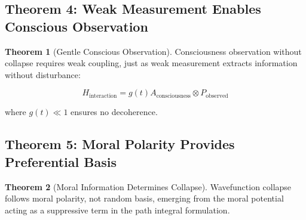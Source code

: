 \documentclass[12pt,a4paper]{article}
\theoremstyle{definition}
\newtheorem{theorem}{Theorem}[section]
\begin{document}
\subsection{Theorem 4: Weak Measurement Enables Conscious Observation}

\begin{theorem}[Gentle Conscious Observation]
Consciousness observation without collapse requires weak coupling, just as weak measurement extracts information without disturbance:

\begin{equation}
H_{\text{interaction}} = g(t) A_{\text{consciousness}} \otimes P_{\text{observed}}
\end{equation}

where $g(t) \ll 1$ ensures no decoherence.
\end{theorem}

\subsection{Theorem 5: Moral Polarity Provides Preferential Basis}

\begin{theorem}[Moral Information Determines Collapse]
Wavefunction collapse follows moral polarity, not random basis, emerging from the moral potential acting as a suppressive term in the path integral formulation.
\end{theorem}
\end{document}
